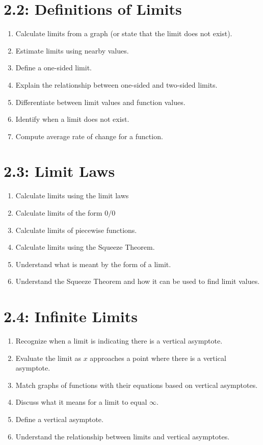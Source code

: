 \documentclass[11pt]{article}
\begin{document}
\section*{2.2: Definitions of Limits}
\begin{enumerate}
	\item Calculate limits from a graph (or state that the limit does not exist).
	\item Estimate limits using nearby values.
	\item Define a one-sided limit.
	\item Explain the relationship between one-sided and two-sided limits.
	\item Differentiate between limit values and function values.
	\item Identify when a limit does not exist.
	\item Compute average rate of change for a function.
\end{enumerate}


\section*{2.3: Limit Laws}
\begin{enumerate}
	\item Calculate limits using the limit laws
	\item Calculate limits of the form $0/0$
	\item Calculate limits of piecewise functions.
	\item Calculate limits using the Squeeze Theorem.
	\item Understand what is meant by the form of a limit.
	\item Understand the Squeeze Theorem and how it can be used to find limit values.
\end{enumerate}


\section*{2.4: Infinite Limits}
\begin{enumerate}
	\item Recognize when a limit is indicating there is a vertical asymptote.
	\item Evaluate the limit as $x$ approaches a point where there is a vertical asymptote.
	\item Match graphs of functions with their equations based on vertical asymptotes.
	\item Discuss what it means for a limit to equal $\infty$.
	\item Define a vertical asymptote.
	\item Understand the relationship between limits and vertical asymptotes.
\end{enumerate}
\end{document}
